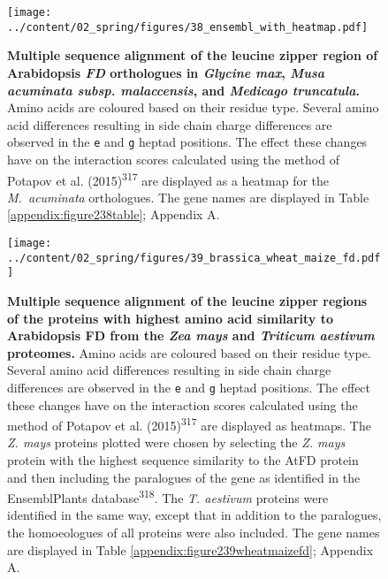 \documentclass[12pt,]{book}
\begin{document}
\begin{figure}[htbp]
\centering
\texttt{[image: ../content/02\_spring/figures/38\_ensembl\_with\_heatmap.pdf]}
\caption{\textbf{Multiple sequence alignment of the leucine zipper
region of Arabidopsis \emph{FD} orthologues in \emph{Glycine max},
\emph{Musa acuminata subsp. malaccensis}, and \emph{Medicago
truncatula}.} Amino acids are coloured based on their residue type.
Several amino acid differences resulting in side chain charge
differences are observed in the \texttt{e} and \texttt{g} heptad
positions. The effect these changes have on the interaction scores
calculated using the method of Potapov et al.
(2015)\textsuperscript{317} are displayed as a heatmap for the
\emph{M.~acuminata} orthologues. The gene names are displayed in Table
\ref{appendix:figure238table}; Appendix A.}\label{figure:238:ensembl}
\end{figure}

\begin{figure}[htbp]
\centering
\texttt{[image: ../content/02\_spring/figures/39\_brassica\_wheat\_maize\_fd.pdf]}
\caption{\textbf{Multiple sequence alignment of the leucine zipper
regions of the proteins with highest amino acid similarity to
Arabidopsis FD from the \emph{Zea mays} and \emph{Triticum aestivum}
proteomes.} Amino acids are coloured based on their residue type.
Several amino acid differences resulting in side chain charge
differences are observed in the \texttt{e} and \texttt{g} heptad
positions. The effect these changes have on the interaction scores
calculated using the method of Potapov et al.
(2015)\textsuperscript{317} are displayed as heatmaps. The \emph{Z.
mays} proteins plotted were chosen by selecting the \emph{Z. mays}
protein with the highest sequence similarity to the AtFD protein and
then including the paralogues of the gene as identified in the
EnsemblPlants database\textsuperscript{318}. The \emph{T. aestivum}
proteins were identified in the same way, except that in addition to the
paralogues, the homoeologues of all proteins were also included. The
gene names are displayed in Table \ref{appendix:figure239wheatmaizefd};
Appendix A.}\label{figure:239:wheatmaizefd}
\end{figure}
\end{document}

